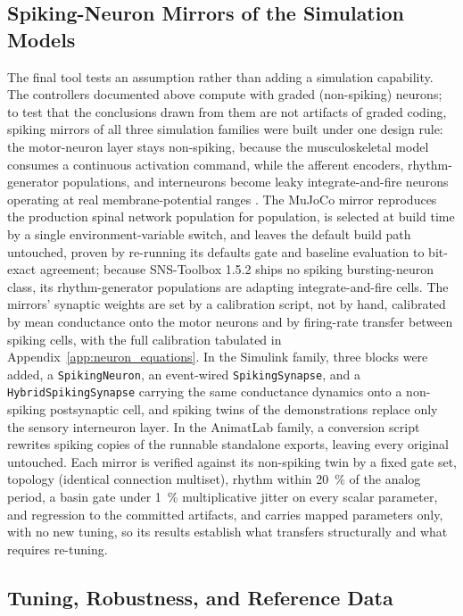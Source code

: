 \subsection{Spiking-Neuron Mirrors of the Simulation Models}\label{sec:spiking_methods}

The final tool tests an assumption rather than adding a simulation capability. The controllers documented above compute with graded (non-spiking) neurons; to test that the conclusions drawn from them are not artifacts of graded coding, spiking mirrors of all three simulation families were built under one design rule: the motor-neuron layer stays non-spiking, because the musculoskeletal model consumes a continuous activation command, while the afferent encoders, rhythm-generator populations, and interneurons become leaky integrate-and-fire neurons operating at real membrane-potential ranges \citep{szczecinski_perspective_2023, nourse_sns_2023}. The MuJoCo mirror reproduces the production spinal network population for population, is selected at build time by a single environment-variable switch, and leaves the default build path untouched, proven by re-running its defaults gate and baseline evaluation to bit-exact agreement; because SNS-Toolbox 1.5.2 ships no spiking bursting-neuron class, its rhythm-generator populations are adapting integrate-and-fire cells. The mirrors' synaptic weights are set by a calibration script, not by hand, calibrated by mean conductance onto the motor neurons and by firing-rate transfer between spiking cells, with the full calibration tabulated in Appendix~\ref{app:neuron_equations}. In the Simulink family, three blocks were added, a \texttt{SpikingNeuron}, an event-wired \texttt{SpikingSynapse}, and a \texttt{HybridSpikingSynapse} carrying the same conductance dynamics onto a non-spiking postsynaptic cell, and spiking twins of the demonstrations replace only the sensory interneuron layer. In the AnimatLab family, a conversion script rewrites spiking copies of the runnable standalone exports, leaving every original untouched. Each mirror is verified against its non-spiking twin by a fixed gate set, topology (identical connection multiset), rhythm within \qty{20}{\percent} of the analog period, a basin gate under \qty{1}{\percent} multiplicative jitter on every scalar parameter, and regression to the committed artifacts, and carries mapped parameters only, with no new tuning, so its results establish what transfers structurally and what requires re-tuning.

\subsection{Tuning, Robustness, and Reference Data}\label{sec:sns_tuning_methods}

